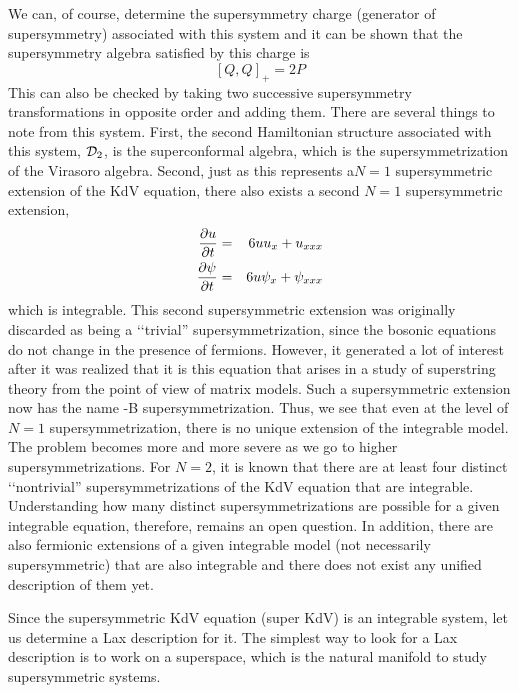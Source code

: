 \documentclass[a4paper,11pt]{article}
\begin{document}
We can, of course, determine the supersymmetry charge (generator of
supersymmetry) associated with this system and it can be shown that
the supersymmetry algebra satisfied by this charge is
\begin{equation}
\left[Q , Q\right]_{+} = 2 P
\end{equation}
This can also be checked by taking two successive supersymmetry
transformations in opposite order and adding them. There are several
things to note from this system. First, the second Hamiltonian
structure associated with this system, ${\cal D}_{2}$, is the
superconformal algebra, which is the supersymmetrization of the
Virasoro algebra. Second, just as this represents a$N=1$
supersymmetric extension of the KdV equation, there also exists a
second $N=1$ supersymmetric extension,
\begin{eqnarray}
{\partial u\over \partial t} & = & 6 u u_{x} + u_{xxx}\nonumber\\
{\partial \psi\over \partial t} & = & 6 u \psi_{x} + \psi_{xxx}
\end{eqnarray}
which is integrable. This second supersymmetric extension was
originally discarded as being a \lq\lq trivial'' supersymmetrization,
since the bosonic equations do not change in the presence of
fermions. However, it generated a lot of interest after it was
realized that it is this equation that arises in a study of
superstring theory from the point of view of matrix models. Such a
supersymmetric extension now has the name -B
supersymmetrization. Thus, we see that even at the level of $N=1$
supersymmetrization, there is no unique extension of the integrable
model. The problem becomes more and more severe as we go to higher
supersymmetrizations. For $N=2$, it is known that there are at least
four distinct \lq\lq nontrivial'' supersymmetrizations of the KdV
equation that are integrable. Understanding how many distinct
supersymmetrizations are possible for a given integrable equation,
therefore, remains an open question. In addition, there are also
fermionic extensions of a given integrable model (not necessarily
supersymmetric) that are also integrable and there does not exist any
unified description of them yet.


Since the supersymmetric KdV equation (super KdV) is an integrable
system, let us determine a Lax description for it. The simplest
way to look for a Lax description is to work on a superspace, which is
the natural manifold to study supersymmetric systems.
\end{document}
